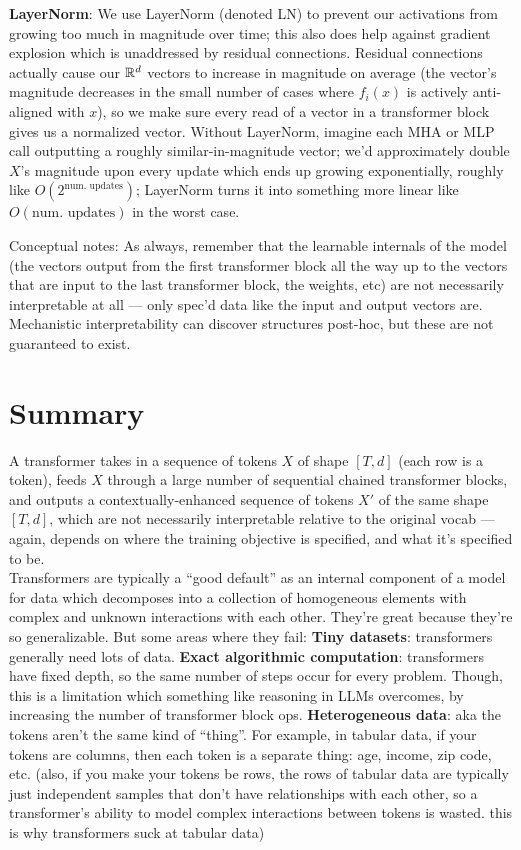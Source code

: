\documentclass[12pt]{article}
\begin{document}
\begin{outline}
\2 \textbf{LayerNorm}: We use LayerNorm (denoted LN) to prevent our activations from growing too much in magnitude over time; this also does help against gradient explosion which is unaddressed by residual connections. Residual connections actually cause our $\mathbb{R}^d$ vectors to increase in magnitude on average (the vector's magnitude decreases in the small number of cases where $f_i(x)$ is actively anti-aligned with $x$), so we make sure every read of a vector in a transformer block gives us a normalized vector. Without LayerNorm, imagine each MHA or MLP call outputting a roughly similar-in-magnitude vector; we'd approximately double $X$'s magnitude upon every update which ends up growing exponentially, roughly like $O(2^{\text{num. updates}})$; LayerNorm turns it into something more linear like $O(\text{num. updates})$ in the worst case.
\\\0

Conceptual notes:
\1 As always, remember that the learnable internals of the model (the vectors output from the first transformer block all the way up to the vectors that are input to the last transformer block, the weights, etc) are not necessarily interpretable at all --- only spec'd data like the input and output vectors are. Mechanistic interpretability can discover structures post-hoc, but these are not guaranteed to exist.
\0

\section{Summary}

A transformer takes in a sequence of tokens $X$ of shape $[T,d]$ (each row is a token), feeds $X$ through a large number of sequential chained transformer blocks, and outputs a contextually-enhanced sequence of tokens $X'$ of the same shape $[T,d]$, which are not necessarily interpretable relative to the original vocab --- again, depends on where the training objective is specified, and what it's specified to be. \\

Transformers are typically a ``good default'' as an internal component of a model for data which decomposes into a collection of homogeneous elements with complex and unknown interactions with each other. They're great because they're so generalizable. But some areas where they fail:
\1 \textbf{Tiny datasets}: transformers generally need lots of data.
\1 \textbf{Exact algorithmic computation}: transformers have fixed depth, so the same number of steps occur for every problem. Though, this is a limitation which something like reasoning in LLMs overcomes, by increasing the number of transformer block ops.
\1 \textbf{Heterogeneous data}: aka the tokens aren't the same kind of ``thing''. For example, in tabular data, if your tokens are columns, then each token is a separate thing: age, income, zip code, etc. (also, if you make your tokens be rows, the rows of tabular data are typically just independent samples that don't have relationships with each other, so a transformer's ability to model complex interactions between tokens is wasted. this is why transformers suck at tabular data)
\\\0

\end{outline}
\end{document}
